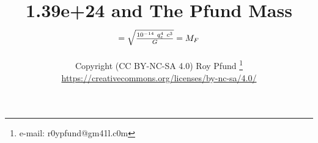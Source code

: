 
\usepackage{pst-node}%
\usepackage{tabu}
\usepackage{natbib}
\usepackage{graphicx}
\usepackage[colorlinks=true,linkcolor=black,anchorcolor=black,citecolor=black,filecolor=black,menucolor=black,runcolor=black,urlcolor=black]{hyperref}%
\title{1.39e+24 and The Pfund Mass $= \sqrt{10^{-14}~q_e^4~c^3 \over G}= M_F$ }
\author{Copyright (CC BY-NC-SA 4.0) Roy Pfund \thanks{e-mail: r0ypfund@gm41l.c0m}\\
\url{https://creativecommons.org/licenses/by-nc-sa/4.0/}}

